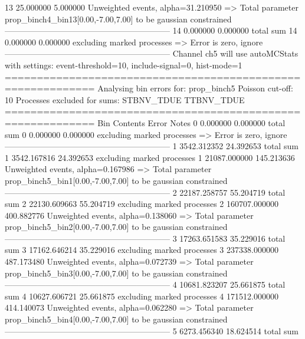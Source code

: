 13         25.000000       5.000000        Unweighted events, alpha=31.210950
  => Total parameter prop_binch4_bin13[0.00,-7.00,7.00] to be gaussian constrained
------------------------------------------------------------
14         0.000000        0.000000        total sum                     
14         0.000000        0.000000        excluding marked processes    
  => Error is zero, ignore      
------------------------------------------------------------
Channel ch5 will use autoMCStats with settings: event-threshold=10, include-signal=0, hist-mode=1
============================================================
Analysing bin errors for: prop_binch5
Poisson cut-off: 10
Processes excluded for sums: STBNV_TDUE TTBNV_TDUE
============================================================
Bin        Contents        Error           Notes                         
0          0.000000        0.000000        total sum                     
0          0.000000        0.000000        excluding marked processes    
  => Error is zero, ignore      
------------------------------------------------------------
1          3542.312352     24.392653       total sum                     
1          3542.167816     24.392653       excluding marked processes    
1          21087.000000    145.213636      Unweighted events, alpha=0.167986
  => Total parameter prop_binch5_bin1[0.00,-7.00,7.00] to be gaussian constrained
------------------------------------------------------------
2          22187.258757    55.204719       total sum                     
2          22130.609663    55.204719       excluding marked processes    
2          160707.000000   400.882776      Unweighted events, alpha=0.138060
  => Total parameter prop_binch5_bin2[0.00,-7.00,7.00] to be gaussian constrained
------------------------------------------------------------
3          17263.651583    35.229016       total sum                     
3          17162.646214    35.229016       excluding marked processes    
3          237338.000000   487.173480      Unweighted events, alpha=0.072739
  => Total parameter prop_binch5_bin3[0.00,-7.00,7.00] to be gaussian constrained
------------------------------------------------------------
4          10681.823207    25.661875       total sum                     
4          10627.606721    25.661875       excluding marked processes    
4          171512.000000   414.140073      Unweighted events, alpha=0.062280
  => Total parameter prop_binch5_bin4[0.00,-7.00,7.00] to be gaussian constrained
------------------------------------------------------------
5          6273.456340     18.624514       total sum                     
